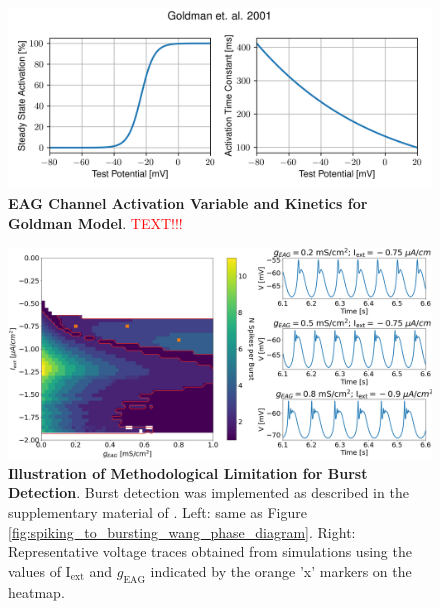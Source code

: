 \documentclass[../main.tex]{subfiles}
\begin{document}
\begin{figure}[!t]
    \centering
    \includegraphics[width=0.8\linewidth]{../img/spiking_to_bursting/eag_goldman.png}
    \caption[EAG Channel Activation Variable and Kinetics for Goldman Model]{
        \textbf{EAG Channel Activation Variable and Kinetics for Goldman Model}. \textcolor{red}{TEXT!!!}
    }
    \label{fig:spiking_to_bursting_eag_params_goldman}
\end{figure}

\begin{figure}[!t]
    \centering
    \includegraphics[width=\linewidth]{../img/spiking_to_bursting/nonlinearity_eag.png}
    \caption[Illustration of Methodological Limitation for Burst Detection]{
        \textbf{Illustration of Methodological Limitation for Burst Detection}. Burst detection was implemented as described in the supplementary material of \cite{franciRobustTunableBursting2018}. Left: same as Figure \ref{fig:spiking_to_bursting_wang_phase_diagram}. Right: Representative voltage traces obtained from simulations using the values of I$_{\text{ext}}$ and $g_{\text{EAG}}$ indicated by the orange 'x' markers on the heatmap.
    }
    \label{fig:nonlinearity_eag}
\end{figure}
\end{document}
